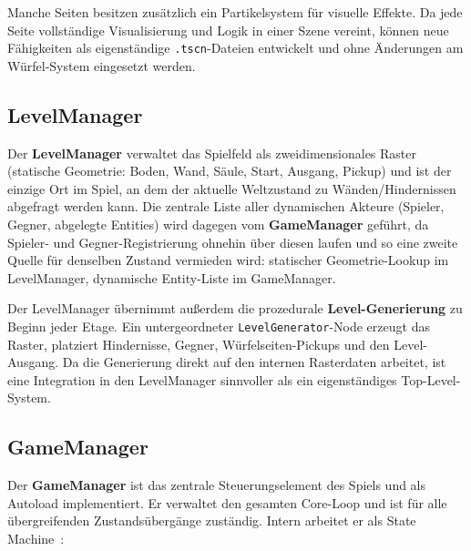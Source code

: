 \documentclass[oneside]{ausarbeitung}
\begin{document}
Manche Seiten besitzen zusätzlich ein Partikelsystem für visuelle Effekte. Da jede Seite vollständige Visualisierung und Logik in einer Szene vereint, können neue Fähigkeiten als eigenständige \texttt{.tscn}-Dateien entwickelt und ohne Änderungen am Würfel-System eingesetzt werden.
 
\subsection{LevelManager}
 
Der \textbf{LevelManager} verwaltet das Spielfeld als zweidimensionales Raster (statische Geometrie: Boden, Wand, Säule, Start, Ausgang, Pickup) und ist der einzige Ort im Spiel, an dem der aktuelle Weltzustand zu Wänden/Hindernissen abgefragt werden kann. Die zentrale Liste aller dynamischen Akteure (Spieler, Gegner, abgelegte Entities) wird dagegen vom \textbf{GameManager} geführt, da Spieler- und Gegner-Registrierung ohnehin über diesen laufen und so eine zweite Quelle für denselben Zustand vermieden wird: statischer Geometrie-Lookup im LevelManager, dynamische Entity-Liste im GameManager.

Der LevelManager übernimmt außerdem die prozedurale \textbf{Level-Generierung} zu Beginn jeder Etage. Ein untergeordneter \texttt{LevelGenerator}-Node erzeugt das Raster, platziert Hindernisse, Gegner, Würfelseiten-Pickups und den Level-Ausgang. Da die Generierung direkt auf den internen Rasterdaten arbeitet, ist eine Integration in den LevelManager sinnvoller als ein eigenständiges Top-Level-System.
 
\subsection{GameManager}
 
Der \textbf{GameManager} ist das zentrale Steuerungselement des Spiels und als Autoload implementiert. Er verwaltet den gesamten Core-Loop und ist für alle übergreifenden Zustandsübergänge zuständig. Intern arbeitet er als State Machine~\cite{gdquest:fsm}:
 
\begin{infoblock}
\end{infoblock}
 
\end{document}
